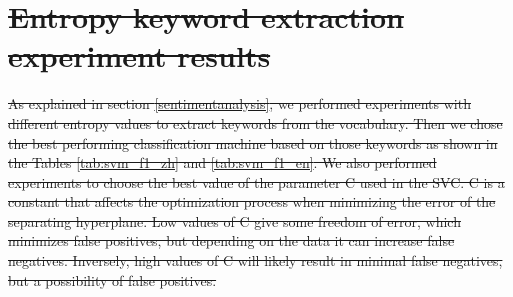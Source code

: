 \documentclass[smallextended,natbib]{svjour3}       %
\providecommand{\DIFdel}[1]{{\protect\color{red}\sout{#1}}}                      %
\begin{document}

\section{\DIFdel{Entropy keyword extraction experiment results}}%
\addtocounter{section}{-1}%

\DIFdel{As explained in section \ref{sentimentanalysis}, we performed experiments with different entropy values to extract keywords from the vocabulary. Then we chose the best performing classification machine based on those keywords as shown in the Tables \ref{tab:svm_f1_zh} and \ref{tab:svm_f1_en}. We also performed experiments to choose the best value of the parameter C used in the SVC. C is a constant that affects the optimization process when minimizing the error of the separating hyperplane. Low values of C give some freedom of error, which minimizes false positives, but depending on the data it can increase false negatives. Inversely, high values of C will likely result in minimal false negatives, but a possibility of false positives. 
}%
\end{document}
